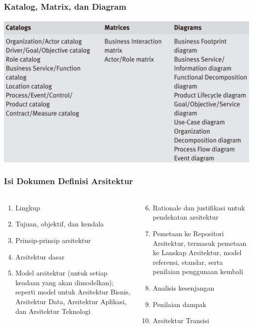 \documentclass[aspectratio=169, table]{beamer}
\begin{document}
	{
		\begin{frame}
			\centering
			\frametitle{Katalog, Matrix, dan Diagram}
			\framesubtitle{\hspace{1cm}}
			\includegraphics[width=.6\textwidth]{../figures/catalogs_matrices_diagrams.png}
		\end{frame}
	}
	
	\begin{frame}
		\frametitle{Isi Dokumen Definisi Arsitektur}
		\framesubtitle{\hspace{1cm}}
		\begin{columns}
			\begin{column}{0.5\textwidth}
				\begin{center}
					\begin{enumerate}
						\item Lingkup
						\item Tujuan, objektif, dan kendala
						\item Prinsip-prinsip arsitektur
						\item Arsitektur dasar
						\item Model arsitektur (untuk setiap keadaan yang akan dimodelkan); seperti model untuk Arsitektur Bisnis, Arsitektur Data, Arsitektur Aplikasi, dan Arsitektur Teknologi
						
					\end{enumerate}
				\end{center}
			\end{column}
			\begin{column}{0.5\textwidth}
				\begin{center}
					\begin{enumerate}
						\setcounter{enumi}{5}
						\item Rationale dan justifikasi untuk pendekatan arsitektur
						\item Pemetaan ke Repositori Arsitektur, termasuk pemetaan ke Lanskap Arsitektur, model referensi, standar, serta penilaian penggunaan kembali
						\item Analisis kesenjangan
						\item Penilaian dampak
						\item Arsitektur Transisi
					\end{enumerate}
				\end{center}
			\end{column}
		\end{columns}
	\end{frame}
	
\end{document}
